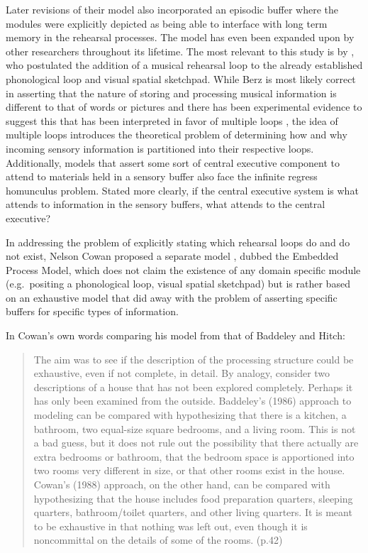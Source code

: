 \documentclass[12pt,]{book}
\begin{document}
Later revisions of their model also incorporated an episodic buffer \citep{baddeleyEpisodicBufferNew2000} where the modules were explicitly depicted as being able to interface with long term memory in the rehearsal processes.
The model has even been expanded upon by other researchers throughout its lifetime.
The most relevant to this study is by \citet{berzWorkingMemoryMusic1995}, who postulated the addition of a musical rehearsal loop to the already established phonological loop and visual spatial sketchpad.
While Berz is most likely correct in asserting that the nature of storing and processing musical information is different to that of words or pictures and there has been experimental evidence to suggest this \citep{williamsonMusiciansNonmusiciansShortterm2010} that has been interpreted in favor of multiple loops \citep{wollnerAttentionalFlexibilityMemory2016}, the idea of multiple loops introduces the theoretical problem of determining how and why incoming sensory information is partitioned into their respective loops.
Additionally, models that assert some sort of central executive component to attend to materials held in a sensory buffer also face the infinite regress homunculus problem.
Stated more clearly, if the central executive system is what attends to information in the sensory buffers, what attends to the central executive?

In addressing the problem of explicitly stating which rehearsal loops do and do not exist, Nelson Cowan proposed a separate model \citep{cowanEvolvingConceptionsMemory1988, cowanWorkingMemoryCapacity2005}, dubbed the Embedded Process Model, which does not claim the existence of any domain specific module (e.g.~positing a phonological loop, visual spatial sketchpad) but is rather based on an exhaustive model that did away with the problem of asserting specific buffers for specific types of information.

In Cowan's own words comparing his model from that of Baddeley and Hitch:

\begin{quote}
The aim was to see if the description of the processing structure could be exhaustive, even if not complete, in detail. By analogy, consider two descriptions of a house that has not been explored completely. Perhaps it has only been examined from the outside. Baddeley's (1986) approach to modeling can be compared with hypothesizing that there is a kitchen, a bathroom, two equal-size square bedrooms, and a living room. This is not a bad guess, but it does not rule out the possibility that there actually are extra bedrooms or bathroom, that the bedroom space is apportioned into two rooms very different in size, or that other rooms exist in the house. Cowan's (1988) approach, on the other hand, can be compared with hypothesizing that the house includes food preparation quarters, sleeping quarters, bathroom/toilet quarters, and other living quarters. It is meant to be exhaustive in that nothing was left out, even though it is noncommittal on the details of some of the rooms. (p.42) \citep{cowanWorkingMemoryCapacity2005}
\end{quote}
\end{document}

